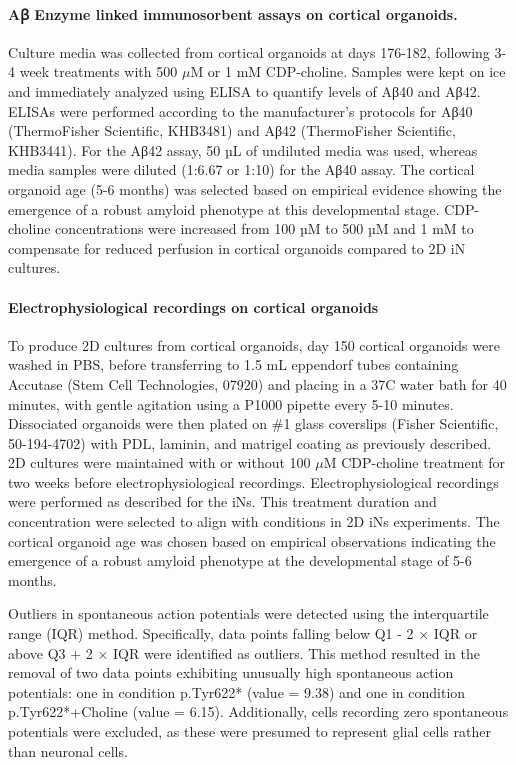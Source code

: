 \documentclass[12pt]{article}
\begin{document}
\paragraph{Aꞵ Enzyme linked immunosorbent assays on cortical organoids.}
Culture media was collected from cortical organoids at days 176-182, following 3-4 week treatments with 500 $\mu$M or 1 mM CDP-choline. Samples were kept on ice and immediately analyzed using ELISA to quantify levels of Aβ40 and Aβ42. ELISAs were performed according to the manufacturer’s protocols for Aβ40 (ThermoFisher Scientific, KHB3481) and Aβ42 (ThermoFisher Scientific, KHB3441). For the Aβ42 assay, 50 µL of undiluted media was used, whereas media samples were diluted (1:6.67 or 1:10) for the Aβ40 assay. The cortical organoid age (5-6 months) was selected based on empirical evidence showing the emergence of a robust amyloid phenotype at this developmental stage. CDP-choline concentrations were increased from 100 µM to 500 µM and 1 mM to compensate for reduced perfusion in cortical organoids compared to 2D iN cultures.

\paragraph{Electrophysiological recordings on cortical organoids}
To produce 2D cultures from cortical organoids, day 150 cortical organoids were washed in PBS, before transferring to 1.5 mL eppendorf tubes containing Accutase (Stem Cell Technologies, 07920) and placing in a 37C water bath for 40 minutes, with gentle agitation using a P1000 pipette every 5-10 minutes. Dissociated organoids were then plated on \#1 glass coverslips (Fisher Scientific, 50-194-4702) with PDL, laminin, and matrigel coating as previously described. 2D cultures were maintained with or without 100 $\mu$M CDP-choline treatment for two weeks before electrophysiological recordings. Electrophysiological recordings were performed as described for the iNs. This treatment duration and concentration were selected to align with conditions in 2D iNs experiments. The cortical organoid age was chosen based on empirical observations indicating the emergence of a robust amyloid phenotype at the developmental stage of 5-6 months.

Outliers in spontaneous action potentials were detected using the interquartile range (IQR) method. Specifically, data points falling below Q1 - 2 × IQR or above Q3 + 2 × IQR were identified as outliers. This method resulted in the removal of two data points exhibiting unusually high spontaneous action potentials: one in condition p.Tyr622* (value = 9.38) and one in condition p.Tyr622*+Choline (value = 6.15). Additionally, cells recording zero spontaneous potentials were excluded, as these were presumed to represent glial cells rather than neuronal cells.
\end{document}
